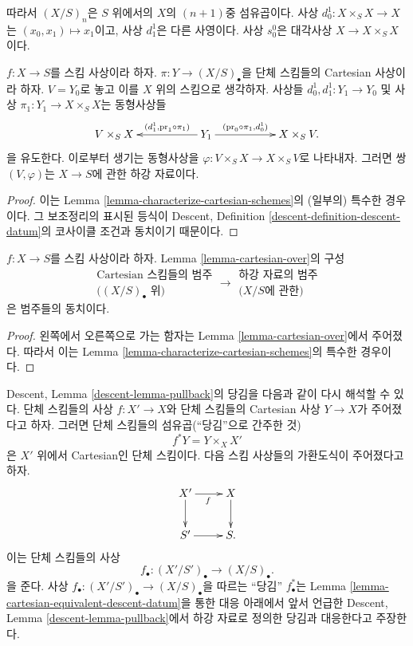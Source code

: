 \noindent
따라서 $(X/S)_n$은 $S$ 위에서의 $X$의 $(n + 1)$중 섬유곱이다.
사상 $d^1_0 : X \times_S X \to X$는
$(x_0, x_1) \mapsto x_1$이고, 사상 $d^1_1$은 다른 사영이다.
사상 $s^0_0$은 대각사상 $X \to X \times_S X$이다.

\begin{lemma}
\label{lemma-cartesian-over}
$f : X \to S$를 스킴 사상이라 하자.
$\pi : Y \to (X/S)_\bullet$을 단체 스킴들의 Cartesian 사상이라 하자.
$V = Y_0$로 놓고 이를 $X$ 위의 스킴으로 생각하자.
사상들 $d^1_0, d^1_1 : Y_1 \to Y_0$ 및 사상
$\pi_1 : Y_1 \to X \times_S X$는 동형사상들
$$
\xymatrix{
V \times_S X & &
Y_1 \ar[ll]_-{(d^1_1, \text{pr}_1 \circ \pi_1)}
\ar[rr]^-{(\text{pr}_0 \circ \pi_1, d^1_0)} & &
X \times_S V.
}
$$
을 유도한다. 이로부터 생기는 동형사상을
$\varphi : V \times_S X \to X \times_S V$로 나타내자.
그러면 쌍 $(V, \varphi)$는 $X \to S$에 관한 하강 자료이다.
\end{lemma}

\begin{proof}
이는 Lemma \ref{lemma-characterize-cartesian-schemes}의 (일부의) 특수한
경우이다. 그 보조정리의 표시된 등식이 Descent, Definition
\ref{descent-definition-descent-datum}의 코사이클 조건과 동치이기 때문이다.
\end{proof}

\begin{lemma}
\label{lemma-cartesian-equivalent-descent-datum}
$f : X \to S$를 스킴 사상이라 하자. Lemma
\ref{lemma-cartesian-over}의 구성
$$
\begin{matrix}
\text{Cartesian 스킴들의 범주} \\
\text{(} (X/S)_\bullet \text{ 위)}
\end{matrix}
\longrightarrow
\begin{matrix}
\text{하강 자료의 범주} \\
\text{(}X/S\text{에 관한)}
\end{matrix}
$$
은 범주들의 동치이다.
\end{lemma}

\begin{proof}
왼쪽에서 오른쪽으로 가는 함자는 Lemma \ref{lemma-cartesian-over}에서
주어졌다. 따라서 이는 Lemma
\ref{lemma-characterize-cartesian-schemes}의 특수한 경우이다.
\end{proof}

\noindent
Descent, Lemma \ref{descent-lemma-pullback}의 당김을 다음과 같이 다시
해석할 수 있다. 단체 스킴들의 사상 $f : X' \to X$와 단체 스킴들의
Cartesian 사상 $Y \to X$가 주어졌다고 하자. 그러면 단체 스킴들의
섬유곱(“당김”으로 간주한 것)
$$
f^*Y = Y \times_X X'
$$
은 $X'$ 위에서 Cartesian인 단체 스킴이다.
다음 스킴 사상들의 가환도식이 주어졌다고 하자.
$$
\xymatrix{
X' \ar[r]_f \ar[d] & X \ar[d] \\
S' \ar[r] & S.
}
$$
이는 단체 스킴들의 사상
$$
f_\bullet : (X'/S')_\bullet \longrightarrow (X/S)_\bullet.
$$
을 준다. 사상
$f_\bullet : (X'/S')_\bullet \to (X/S)_\bullet$을 따르는 “당김”
$f_\bullet^*$는 Lemma
\ref{lemma-cartesian-equivalent-descent-datum}을 통한 대응 아래에서 앞서
언급한 Descent, Lemma \ref{descent-lemma-pullback}에서 하강 자료로
정의한 당김과 대응한다고 주장한다.


